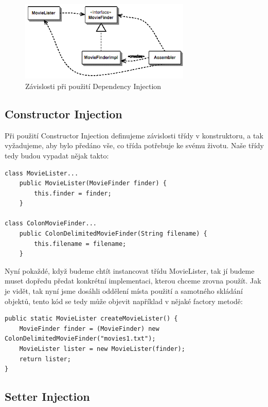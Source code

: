 \documentclass[a4paper,conference]{IEEEtran}
\begin{document}
\begin{figure}[!ht]
\centering
\includegraphics[width=3.2in]{2-Injector}
\caption{Závislosti při použití Dependency Injection}
\label{fig:injector}
\end{figure}

\subsection{Constructor Injection}

Při použití Constructor Injection definujeme závislosti třídy v konstruktoru, a tak vyžadujeme, aby bylo předáno vše, co třída potřebuje ke svému životu. Naše třídy tedy budou vypadat nějak takto:

\lstset{language=Java, caption=MovieLister s použitím Constructor Injection, label=listing:Java}
\begin{lstlisting}
class MovieLister...
    public MovieLister(MovieFinder finder) {
        this.finder = finder;       
    }

class ColonMovieFinder...
    public ColonDelimitedMovieFinder(String filename) {
        this.filename = filename;
    }
\end{lstlisting}

Nyní pokaždé, když budeme chtít instancovat třídu MovieLister, tak jí budeme muset dopředu předat konkrétní implementaci, kterou chceme zrovna použít. Jak je vidět, tak nyní jsme dosáhli oddělení místa použití a samotného skládání objektů, tento kód se tedy může objevit například v nějaké factory metodě:

\lstset{language=Java, caption=Příklad použití ve factory metodě, label=listing:Java}
\begin{lstlisting}
public static MovieLister createMovieLister() {
    MovieFinder finder = (MovieFinder) new ColonDelimitedMovieFinder("movies1.txt");
    MovieLister lister = new MovieLister(finder);
    return lister;
}
\end{lstlisting}

\subsection{Setter Injection}
\end{document}
